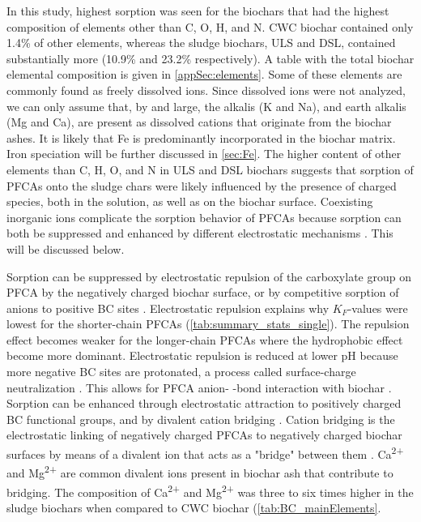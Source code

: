In this study, highest sorption was seen for the biochars that had the highest composition of elements other than C, O, H, and N. CWC biochar contained only 1.4\% of other elements, whereas the sludge biochars, ULS and DSL, contained substantially more (10.9\% and 23.2\% respectively). A table with the total biochar elemental composition is given in \cref{appSec:elements}. Some of these elements are commonly found as freely dissolved ions. Since dissolved ions were not analyzed, we can only assume that, by and large, the alkalis (K and Na), and earth alkalis (Mg and Ca), are present as dissolved cations that originate from the biochar ashes. It is likely that Fe is predominantly incorporated in the biochar matrix. Iron speciation will be further discussed in \cref{sec:Fe}. The higher content of other elements than C, H, O, and N in ULS and DSL biochars suggests that sorption of PFCAs onto the sludge chars were likely influenced by the presence of charged species, both in the solution, as well as on the biochar surface. Coexisting inorganic ions complicate the sorption behavior of PFCAs because sorption can both be suppressed and enhanced by different electrostatic mechanisms \citep{du2014adsorption}. This will be discussed below. 

Sorption can be suppressed by electrostatic repulsion of the carboxylate group on PFCA by the negatively charged biochar surface, or by competitive sorption of anions to positive BC sites \citep{sigmund2022sorption}. Electrostatic repulsion explains why $K_F$-values were lowest for the shorter-chain PFCAs (\cref{tab:summary_stats_single}). The repulsion effect becomes weaker for the longer-chain PFCAs where the hydrophobic effect become more dominant. Electrostatic repulsion is reduced at lower pH because more negative BC sites are protonated, a process called surface-charge neutralization \citep{zhang2013sorption}. This allows for PFCA anion- \textpi-bond interaction with biochar \citep{sigmund2022sorption}. Sorption can be enhanced through electrostatic attraction to positively charged BC functional groups, and by divalent cation bridging \citep{du2014adsorption}. Cation bridging is the electrostatic linking of negatively charged PFCAs to negatively charged biochar surfaces by means of a divalent ion that acts as a "bridge" between them \citep{sigmund2022sorption}. Ca\textsuperscript{2+} and Mg\textsuperscript{2+} are common divalent ions present in biochar ash that contribute to bridging. The composition of Ca\textsuperscript{2+} and Mg\textsuperscript{2+} was three to six times higher in the sludge biochars when compared to CWC biochar (\cref{tab:BC_mainElements}. 

